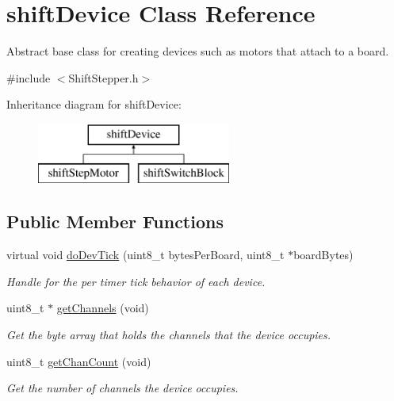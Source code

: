 \hypertarget{classshift_device}{
\section{shiftDevice Class Reference}
\label{classshift_device}
}


Abstract base class for creating devices such as motors that attach to a board.  




{\ttfamily \#include $<$ShiftStepper.h$>$}

Inheritance diagram for shiftDevice:\begin{figure}[H]
\begin{center}
\leavevmode
\includegraphics[height=2.000000cm]{classshift_device}
\end{center}
\end{figure}
\subsection*{Public Member Functions}
\begin{DoxyCompactItemize}
\item 
virtual void \hyperlink{classshift_device_ab67731aedf33aad1b8c6dcbdbd01ecff}{doDevTick} (uint8\_\-t bytesPerBoard, uint8\_\-t $\ast$boardBytes)
\begin{DoxyCompactList}\small\item\em Handle for the per timer tick behavior of each device. \item\end{DoxyCompactList}\item 
uint8\_\-t $\ast$ \hyperlink{classshift_device_a56b744e801a501975b323f4d3336b6f1}{getChannels} (void)
\begin{DoxyCompactList}\small\item\em Get the byte array that holds the channels that the device occupies. \item\end{DoxyCompactList}\item 
uint8\_\-t \hyperlink{classshift_device_a38f7799b9f1ae1269bba5da52fd84b4b}{getChanCount} (void)
\begin{DoxyCompactList}\small\item\em Get the number of channels the device occupies. \item\end{DoxyCompactList}\end{DoxyCompactItemize}
